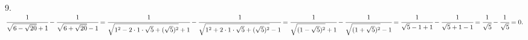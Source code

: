 9. $\cfrac{1}{\sqrt{6-\sqrt{20}}+1}-\cfrac{1}{\sqrt{6+\sqrt{20}}-1}=\cfrac{1}{\sqrt{1^2-2\cdot1\cdot\sqrt{5}+(\sqrt{5})^2}+1}-\cfrac{1}{\sqrt{1^2+2\cdot1\cdot\sqrt{5}+(\sqrt{5})^2}-1}=
\cfrac{1}{\sqrt{(1-\sqrt{5})^2}+1}-\cfrac{1}{\sqrt{(1+\sqrt{5})^2}-1}=\cfrac{1}{\sqrt{5}-1+1}-\cfrac{1}{\sqrt{5}+1-1}=
\cfrac{1}{\sqrt{5}}-\cfrac{1}{\sqrt{5}}=0.$\\
